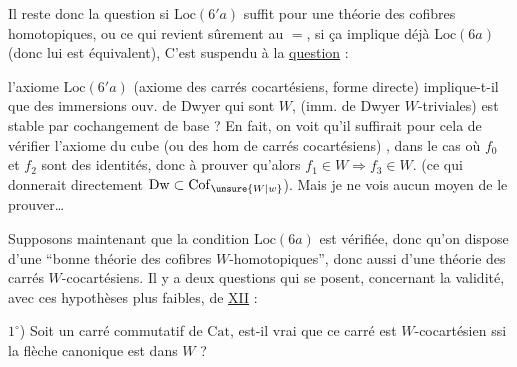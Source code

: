 Il reste donc la question si $\mathrm{Loc}(6'a)$  suffit pour une théorie des cofibres homotopiques, ou ce qui revient sûrement au $=$, si ça implique déjà $\mathrm{Loc}(6a)$ (donc lui est équivalent), C'est  suspendu à la \uline{question} :


l'axiome $\mathrm{Loc}(6'a)$ (axiome des carrés cocartésiens, forme directe) implique-t-il que  des immersions ouv. de Dwyer qui sont  $W$,  (imm. de Dwyer $W$-triviales) est stable par cochangement de base ?
En fait, on voit qu'il suffirait pour cela de vérifier l'axiome du cube (ou des hom de carrés cocartésiens) , dans le cas où $f_0$ et $f_2$ sont des identités, donc à prouver qu'alors $f_1\in W\Longrightarrow f_3\in W$. (ce qui donnerait directement $\mathrm{Dw}\subset\mathrm{Cof}_{\unsure{W|w}}$). Mais je ne vois aucun moyen de le prouver\ldots

Supposons maintenant que la condition $\mathrm{Loc}(6a)$ est vérifiée, donc qu'on dispose d'une ``bonne théorie des cofibres $W$-homotopiques'', donc aussi d'une théorie des carrés $W$-cocartésiens. Il y a deux questions qui se posent, concernant la validité, avec ces hypothèses plus faibles,  de \uline{XII} :

$1^\circ$) Soit un carré commutatif
de $\mathrm{Cat}$, est-il vrai que ce carré est $W$-cocartésien ssi la flèche canonique
est dans $W$ ?

